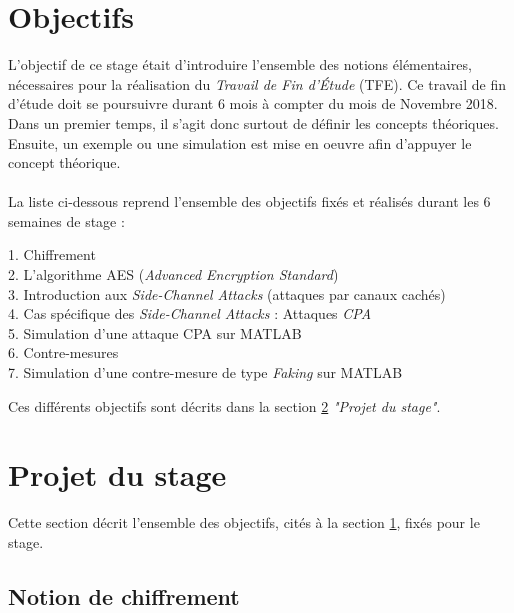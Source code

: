 \documentclass[10pt, oneside, a4paper]{article}
\begin{document}
\newpage
\section{Objectifs }
\label{sec:objectifs}

 
L'objectif de ce stage était d'introduire l'ensemble des notions élémentaires, nécessaires pour la réalisation du \textit{Travail de Fin d'Étude} (TFE). Ce travail de fin d'étude doit se poursuivre durant 6 mois à compter du mois de Novembre 2018. Dans un premier temps, il s'agit donc surtout de définir les concepts théoriques. Ensuite, un exemple ou une simulation est mise en oeuvre afin d'appuyer le concept théorique.\\ \\
La liste ci-dessous reprend l'ensemble des objectifs fixés et réalisés durant les 6 semaines de stage : 
\begin{description}
\item[1. Chiffrement] 
\item[2. L'algorithme AES (\textit{Advanced Encryption Standard})]
\item[3. Introduction aux \textit{Side-Channel Attacks} (attaques par canaux cachés)]
\item[4. Cas spécifique des \textit{Side-Channel Attacks} : Attaques \textit{CPA}] 
\item[5. Simulation d'une attaque CPA sur MATLAB] 
\item[6. Contre-mesures] 
\item[7. Simulation d'une contre-mesure de type \textit{Faking} sur MATLAB] 
\end{description}
Ces différents objectifs sont décrits dans la section \ref{sec:Projet} \textit{"Projet du stage"}.

\section{Projet du stage}
\label{sec:Projet}

Cette section décrit l'ensemble des objectifs, cités à la section \ref{sec:objectifs}, fixés pour le stage. 

\subsection{Notion de chiffrement}
\end{document}
